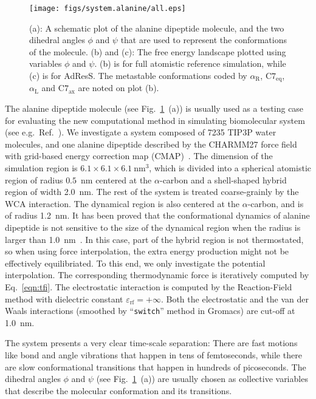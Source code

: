 \documentclass[epjST]{svjour}
\newcommand{\confa}[0]{{\alpha_{\textrm{R}}}}
\newcommand{\confb}[0]{{\textrm{C}7_{\textrm{eq}}}}
\newcommand{\confc}[0]{{\alpha_{\textrm{L}}}}
\newcommand{\confd}[0]{{\textrm{C}7_{\textrm{ax}}}}
\begin{document}
\begin{figure}
  \centering
  \texttt{[image: figs/system.alanine/all.eps]}
  \caption{(a): A schematic plot of the alanine dipeptide molecule,
    and the two dihedral angles $\phi$ and $\psi$ that are used to
    represent the conformations of the molecule. (b) and (c): The free
    energy landscape plotted using variables $\phi$ and $\psi$.  (b)
    is for full atomistic reference simulation, while (c) is for
    AdResS. The metastable conformations coded by $\confa$, $\confb$, $\confc$ and $\confd$
    are noted on plot (b).}
  \label{fig:ala}
\end{figure}

The alanine dipeptide molecule (see Fig.~\ref{fig:ala}~(a)) is usually
used as a testing case for evaluating the new computational method in simulating 
biomolecular system (see e.g.~Ref.~\cite{apostolakis1999calculation,chodera2007automatic,kaminsky2007force,gfeller2007complex}).
We investigate a system composed of
7235 TIP3P water molecules, and
one alanine dipeptide described by the CHARMM27 force field~\cite{foloppe2000all} with
grid-based energy correction map (CMAP)~\cite{mackerell2004extending}. 
The dimension of the simulation region is $6.1\times6.1\times6.1~\textrm{nm}^3$, which is divided into
a spherical atomistic region of radius  $0.5$~nm centered at the $\alpha$-carbon and a  shell-shaped hybrid region of width 2.0~nm.
The rest of the system is treated coarse-grainly by the WCA interaction.
The dynamical region  is
also centered at the $\alpha$-carbon, and is of radius 1.2~nm.
It has been proved that the conformational dynamics of alanine dipeptide is not sensitive to the size of
the dynamical region when the radius is larger than 1.0~nm~\cite{wang2014exploring}.
In this case, part of the hybrid region is not thermostated, so
when using force interpolation, the extra energy production might not be effectively equilibriated.
To this end, we only investigate the potential interpolation. The corresponding
thermodynamic force is iteratively computed by
Eq.~\eqref{eqn:tfi}.
The electrostatic interaction is computed by the Reaction-Field method with dielectric constant $\varepsilon_{\textrm{rf}} = +\infty$.
Both the electrostatic and the van der Waals interactions (smoothed by ``\texttt{switch}'' method in Gromacs)
are cut-off at 1.0~nm.

The system presents a very clear time-scale separation: There are fast
motions like bond and angle vibrations that happen in tens of femtoseconds, while
there are slow conformational transitions that happen in hundreds of picoseconds.
The dihedral angles $\phi$ and $\psi$ (see
Fig.~\ref{fig:ala}~(a)) are usually chosen as collective variables that  describe
the molecular conformation and its transitions.
\end{document}
